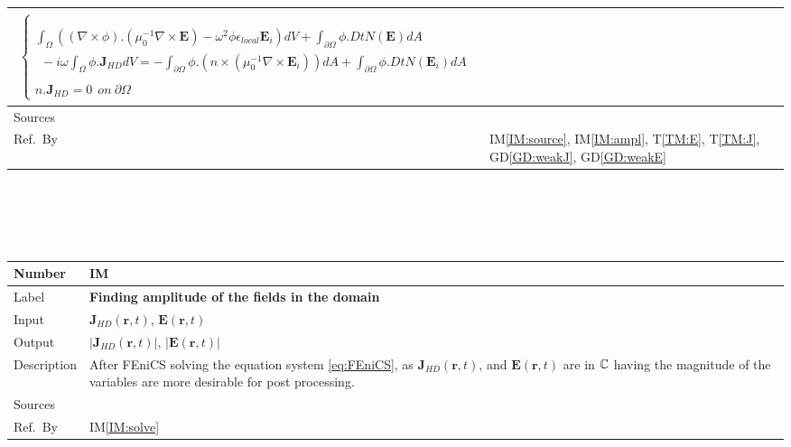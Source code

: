 \documentclass[12pt]{article}
\newcommand{\colBwidth}{0.82\textwidth} \newcommand{\colCwidth}{0.1\textwidth}
\newcounter{instnum} %
\begin{document}
\begin{minipage}{\textwidth}
\begin{tabular}{| p{\colAwidth} |
				p{\colBwidth}|}
\begin{equation}
\begin{gathered}
\begin{cases}
						\\ \\ \int_\Omega ((\nabla \times \phi).(\mu^{-1}_{0} \nabla \times
						\textbf{E})- \omega^2\phi \epsilon_{local} \textbf{E}_i)dV + \int_{\partial
							\Omega} \phi . DtN(\textbf{E})dA\\ \ \ - i\omega \int_\Omega \phi .
						\textbf{J}_{HD}dV =  -\int_{\partial \Omega} \phi.(n \times (\mu^{-1}_0
						\nabla \times \textbf{E}_i))dA + \int_{\partial \Omega}
						\phi.DtN(\textbf{E}_i)dA
						\\
						\\ n.\textbf{J}_{HD}=0 \ \ on \ \partial \Omega \end{cases} \end{gathered} 
			\end{equation} \\
			\hline Sources& \cite{hiremath2012numerical}\\ 
			\hline 
			Ref.\ By & IM\ref{IM:source}, IM\ref{IM:ampl}, T\ref{TM:E}, T\ref{TM:J}, GD\ref{GD:weakJ}, GD\ref{GD:weakE} 
			\\ \hline
	\end{tabular} \end{minipage}\\
	
	
	
	~\newline
	
	
	
	~\newline \noindent \begin{minipage}{\textwidth}
		\renewcommand*{\arraystretch}{1.5} \begin{tabular}{| p{\colAwidth} |
				p{\colBwidth}|} \hline \rowcolor[gray]{0.9} Number&
			IM{instnum}\theinstnum \label{IM:ampl}\\ \hline Label& \bf
			Finding amplitude of the fields in the domain\\ \hline Input&$\textbf{J}_{HD}(\textbf{r},t)$, $\textbf{E}(\textbf{r},t)$
			 \\
			\hline Output& $|\textbf{J}_{HD}(\textbf{r},t)|$, $|\textbf{E}(\textbf{r},t)|$
			\\
			\hline 
			Description&
			After FEniCS solving the equation system \ref{eq:FEniCS}, as $\textbf{J}_{HD}(\textbf{r},t)$, and  $\textbf{E}(\textbf{r},t)$ are in $\Bbb C$ having the magnitude of the variables are more desirable for post processing.
			 \\
			\hline Sources& \cite{monk2003finite} \\ \hline Ref.\ By &  IM\ref{IM:solve}\\ \hline \end{tabular} \end{minipage}\\
	
\end{document}
